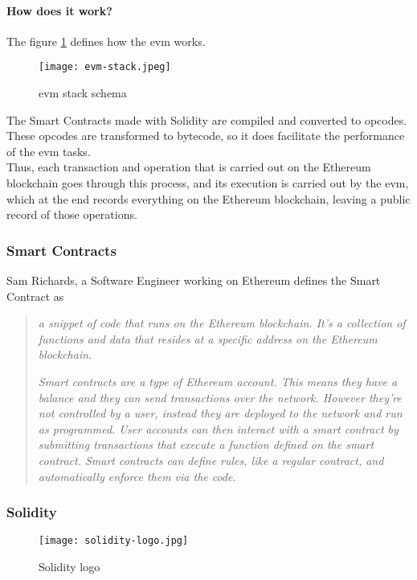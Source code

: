             \paragraph{How does it work?}
                The figure \ref{fig:blockchain_stack} defines how the \acrshort{evm} works\cite{queEsEvm}.
                \begin{figure}[h]
                    \centering
                    \texttt{[image: evm-stack.jpeg]}
                    \caption{\acrshort{evm} stack schema}
                    \label{fig:blockchain_stack}
                \end{figure}

                The Smart Contracts made with Solidity are compiled and converted to opcodes. These opcodes are transformed to bytecode, so it does facilitate the performance of the \acrshort{evm} tasks.\\

                Thus, each transaction and operation that is carried out on the Ethereum blockchain goes through this process, and its execution is carried out by the \acrshort{evm}, which at the end records everything on the Ethereum blockchain, leaving a public record of those operations. 

        \subsubsection{Smart Contracts}
            Sam Richards\cite{smartContracts}, a Software Engineer working on Ethereum defines the Smart Contract as 
            \begin{quote}
                \textit{a snippet of code that runs on the Ethereum blockchain. It's a collection of functions and data that resides at a specific address on the Ethereum blockchain.}

                \textit{Smart contracts are a type of Ethereum account. This means they have a balance and they can send transactions over the network. However they're not controlled by a user, instead they are deployed to the network and run as programmed. User accounts can then interact with a smart contract by submitting transactions that execute a function defined on the smart contract. Smart contracts can define rules, like a regular contract, and automatically enforce them via the code.}
            \end{quote}

        \subsubsection{Solidity}
            \begin{figure}[h]
                \centering
                \texttt{[image: solidity-logo.jpg]}
                \caption{Solidity logo}
                \label{fig:solidity_logo}
            \end{figure}
            
